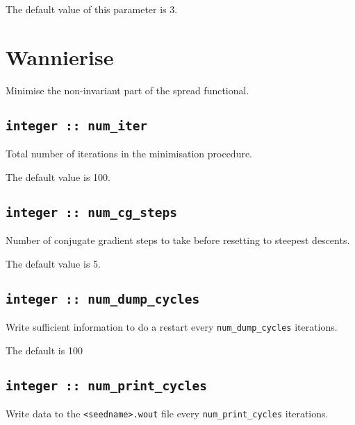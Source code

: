 The default value of this parameter is 3.



\section{Wannierise}
Minimise the non-invariant part of the spread functional.

\subsection[num\_iter]{\tt integer :: num\_iter}

Total number of iterations in the minimisation procedure.

The default value is 100.

\subsection[num\_cg\_steps]{\tt integer :: num\_cg\_steps}

Number of conjugate gradient steps to take before resetting to steepest descents.

The default value is 5.







\subsection[num\_dump\_cycles]{\tt integer :: num\_dump\_cycles}
Write sufficient information to do a restart every
\verb#num_dump_cycles# iterations.

The default is 100

\subsection[num\_print\_cycles]{\tt integer :: num\_print\_cycles}
Write data to the {\tt <seedname>.wout} file every
\verb#num_print_cycles# iterations.


